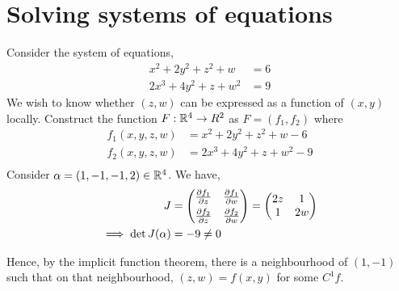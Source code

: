 \documentclass[../Analysis-3.tex]{subfiles}
\begin{document}
\section{Solving systems of equations}      
\begin{Eg}{}{}
  Consider the system of equations,
  \begin{align*}
   x^2 + 2y^2 + z^2 + w &= 6 \\
   2x^3 + 4y^2 + z + w^2 &= 9   
  \end{align*}
  We wish to know whether \( (z,w) \) can be expressed as a function of \( (x,y) \) locally. Construct the function \( F: \mathbb{R}^4 \to R^2 \) as \( F = (f_1, f_2) \) where
  \begin{align*}
     f_1(x,y,z,w) &= x^2 + 2y^2 + z^2 + w - 6 \\
     f_2(x,y,z,w) &= 2x^3 + 4y^2 + z + w^2 - 9 \\
  \end{align*}
  Consider \( \alpha = (1,-1, -1, 2) \in \mathbb{R}^4 \). We have,
  \begin{align*}
     J &= 
     \begin{pmatrix}
       \pdv{f_1}{z} & \pdv{f_1}{w} \\[4pt]
       \pdv{f_2}{z} & \pdv{f_2}{w}
     \end{pmatrix}
     = 
     \begin{pmatrix}
       2z & 1 \\
       1 & 2w 
     \end{pmatrix} \\
     \implies \det J(\alpha) &= -9 \neq 0
  \end{align*}

  Hence, by the implicit function theorem, there is a neighbourhood of \( (1,-1) \) such that on that neighbourhood, \( (z,w) = f(x,y) \) for some \( C^1 f \).

\end{Eg}
  
\end{document}
